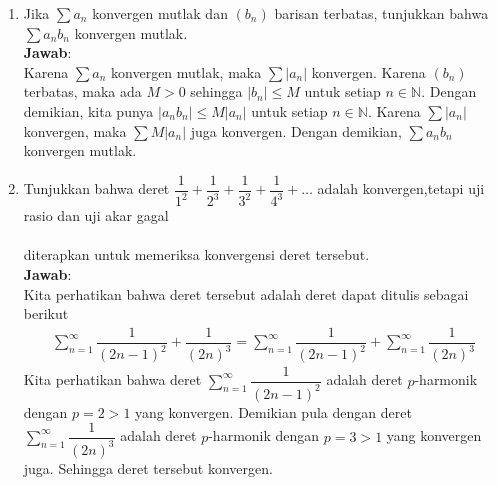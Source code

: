 \documentclass{article}
\newcommand{\jawab}{\textbf{Jawab}:}
\newcommand{\N}{\mathbb{N}}
\begin{document}
\begin{enumerate}
\begin{enumerate}
            \item Apakah $(f_n)$ konvergen seragam pada $A$? Jelaskan!\\
            \jawab\\
            Tidak konvergen seragam, karena $f$ tidak kontinu pada $A$, padahal $(f_n)$ kontinu 
            untuk setiap $n\in\N$.
        \end{enumerate}
        \item Jika $\sum a_n$ konvergen mutlak dan $(b_n)$ barisan terbatas, tunjukkan bahwa $\sum a_nb_n$ konvergen mutlak.\\
        \jawab\\
        Karena $\sum a_n$ konvergen mutlak, maka $\sum |a_n|$ konvergen. Karena $(b_n)$ terbatas,
        maka ada $M>0$ sehingga $|b_n|\leq M$ untuk setiap $n\in\N$. Dengan demikian, kita punya 
        $|a_nb_n|\leq M|a_n|$ untuk setiap $n\in\N$. Karena $\sum |a_n|$ konvergen, maka $\sum M|a_n|$
        juga konvergen. Dengan demikian, $\sum a_nb_n$ konvergen mutlak.

        \item Tunjukkan bahwa deret $\dfrac{1}{1^2}+\dfrac{1}{2^3}+\dfrac{1}{3^2}+\dfrac{1}{4^3}+\dots$ adalah konvergen,tetapi uji rasio dan uji akar gagal \\~\\
        diterapkan untuk memeriksa konvergensi deret tersebut.\\

        \jawab\\
        Kita perhatikan bahwa deret tersebut adalah deret dapat ditulis sebagai berikut
        \begin{align*}
            \sum_{n=1}^{\infty}\dfrac{1}{(2n-1)^2}+\dfrac{1}{(2n)^3}=\sum_{n=1}^{\infty}\dfrac{1}{(2n-1)^2}+\sum_{n=1}^{\infty}\dfrac{1}{(2n)^3}
        \end{align*}
        Kita perhatikan bahwa deret $\sum_{n=1}^{\infty}\dfrac{1}{(2n-1)^2}$ adalah deret $p$-harmonik dengan $p=2>1$ yang konvergen. 
        Demikian pula dengan deret $\sum_{n=1}^{\infty}\dfrac{1}{(2n)^3}$ adalah deret $p$-harmonik dengan $p=3>1$ yang konvergen juga.
        Sehingga deret tersebut konvergen.\\


\end{enumerate}
\end{document}
